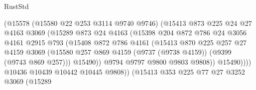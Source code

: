 \begin{lexlean}{RustStd}
\begin{coremodule}
                                (@15578
                                  (@15580 @22 @253 @3114 @9740 @9746)
                                  (@15413
                                    @873
                                    @225
                                    @24
                                    @27
                                    @4163
                                    @3069
                                    (@15289
                                      @873
                                      @24
                                      @4163
                                      (@15398
                                        @204
                                        @872
                                        @786
                                        @24
                                        @3056
                                        @4161
                                        @2915
                                        @793
                                        (@15408
                                          @872
                                          @786
                                          @4161
                                          (@15413
                                            @870
                                            @225
                                            @257
                                            @27
                                            @4159
                                            @3069
                                            (@15580
                                              @257
                                              @869
                                              @4159
                                              (@9737 (@9738 @4159))
                                              (@9399 (@9743 @869 @257)))
                                            @15490))
                                        @9794
                                        @9797
                                        @9800
                                        @9803
                                        @9808))
                                    @15490))))
                            @10436
                            @10439
                            @10442
                            @10445
                            @9808))
                        (@15413
                          @353
                          @225
                          @77
                          @27
                          @3252
                          @3069
                          (@15289

\end{coremodule}
\end{lexlean}

